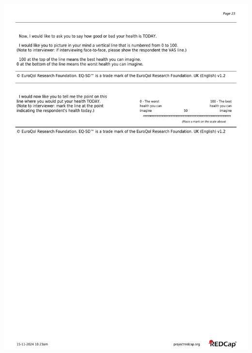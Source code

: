 \documentclass[
]{scrartcl}
\begin{document}
\includegraphics{../case-record-form/instrument-pdfs/pages/all-instruments-23.pdf}
\end{document}
